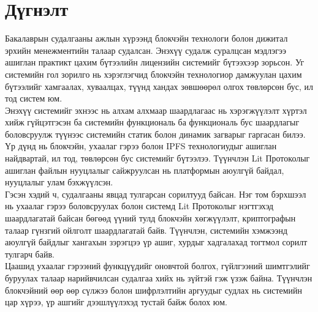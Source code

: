 \chapter{Дүгнэлт}
\indent Бакалаврын судалгааны ажлын хүрээнд блокчэйн технологи болон дижитал эрхийн менежментийн талаар судалсан. Энэхүү судалж суралцсан мэдлэгээ ашиглан практикт цахим бүтээлийн лицензийн системийг бүтээхээр зорьсон. Уг системийн гол зорилго нь хэрэглэгчид блокчэйн технологиор дамжуулан цахим бүтээлийг хамгаалах, хуваалцах, түүнд хандах зөвшөөрөл олгох төвлөрсөн бус, ил тод систем юм.
\\ \indent Энэхүү системийг эхнээс нь алхам алхмаар шаардлагаас нь хэрэгжүүлэлт хүртэл хийж гүйцэтгэсэн ба системийн функциональ ба функциональ бус шаардлагыг боловсруулж түүнээс системийн статик болон динамик загварыг гаргасан билээ. Үр дүнд нь блокчэйн, ухаалаг гэрээ болон IPFS технологиудыг ашиглан найдвартай, ил тод, төвлөрсөн бус системийг бүтээлээ. Түүнчлэн Lit Протоколыг ашиглан файлын нууцлалыг сайжруулсан нь платформын аюулгүй байдал, нууцлалыг улам бэхжүүлсэн.
\\ \indent Гэсэн хэдий ч, судалгааны явцад тулгарсан сорилтууд байсан. Нэг том бэрхшээл нь ухаалаг гэрээ боловсруулах болон системд Lit Протоколыг нэгтгэхэд шаардлагатай байсан бөгөөд үүний тулд блокчэйн хөгжүүлэлт, криптографын талаар гүнзгий ойлголт шаардлагатай байв. Түүнчлэн, системийн хэмжээнд аюулгүй байдлыг хангахын зэрэгцээ үр ашиг, хурдыг хадгалахад тогтмол сорилт тулгарч байв.
\\ \indent  Цаашид ухаалаг гэрээний функцүүдийг оновчтой болгох, гүйлгээний шимтгэлийг буруулах талаар нарийвчилсан судалгаа хийх нь зүйтэй гэж үзэж байна. Түүнчлэн блокчэйний өөр өөр сүлжээ болон шифрлэлтийн аргуудыг судлах нь системийн цар хүрээ, үр ашгийг дээшлүүлэхэд тустай байж болох юм.